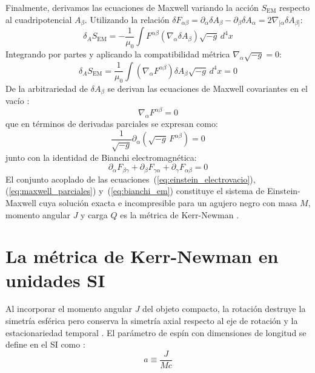 Finalmente, derivamos las ecuaciones de Maxwell variando la acción $S_{\mathrm{EM}}$ respecto al cuadripotencial $A_\beta$. Utilizando la relación $\delta F_{\alpha\beta} = \partial_\alpha \delta A_\beta - \partial_\beta \delta A_\alpha = 2 \nabla_{[\alpha} \delta A_{\beta]}$:
\begin{equation}
    \delta_A S_{\mathrm{EM}} = -\frac{1}{\mu_0} \int F^{\alpha\beta} (\nabla_\alpha \delta A_\beta) \sqrt{-g} \, d^4x
    \label{eq:var_maxwell_1}
\end{equation}
Integrando por partes y aplicando la compatibilidad métrica $\nabla_\alpha \sqrt{-g} = 0$:
\begin{equation}
    \delta_A S_{\mathrm{EM}} = \frac{1}{\mu_0} \int \left( \nabla_\alpha F^{\alpha\beta} \right) \delta A_\beta \sqrt{-g} \, d^4x = 0
    \label{eq:var_maxwell_2}
\end{equation}
De la arbitrariedad de $\delta A_\beta$ se derivan las ecuaciones de Maxwell covariantes en el vacío \citep{M_P_Hobson_General_Relativity, Sean_Carroll_Spacetime}:
\begin{equation}
    \nabla_\alpha F^{\alpha\beta} = 0
    \label{eq:maxwell_covariante}
\end{equation}
que en términos de derivadas parciales se expresan como:
\begin{equation}
    \frac{1}{\sqrt{-g}} \partial_\alpha \left( \sqrt{-g} \, F^{\alpha\beta} \right) = 0
    \label{eq:maxwell_parciales}
\end{equation}
junto con la identidad de Bianchi electromagnética:
\begin{equation}
    \partial_\alpha F_{\beta\gamma} + \partial_\beta F_{\gamma\alpha} + \partial_\gamma F_{\alpha\beta} = 0
    \label{eq:bianchi_em}
\end{equation}
El conjunto acoplado de las ecuaciones~(\ref{eq:einstein_electrovacio}), (\ref{eq:maxwell_parciales}) y~(\ref{eq:bianchi_em}) constituye el sistema de Einstein-Maxwell  cuya solución exacta e incompresible para un agujero negro con masa $M$, momento angular $J$ y carga $Q$ es la métrica de Kerr-Newman \citep{1403.5234v2, 05villegas}.




\section{La métrica de Kerr-Newman en unidades SI}

Al incorporar el momento angular $J$ del objeto compacto, la rotación destruye la simetría esférica pero conserva la simetría axial respecto al eje de rotación y la estacionariedad temporal \citep{1403.5234v2, Sean_Carroll_Spacetime}. El parámetro de espín con dimensiones de longitud se define en el SI como \citep{M_P_Hobson_General_Relativity, s10052-021-09180-y}:
\begin{equation}
    a \equiv \frac{J}{M c}
    \label{eq:parametro_espin_SI}
\end{equation}

